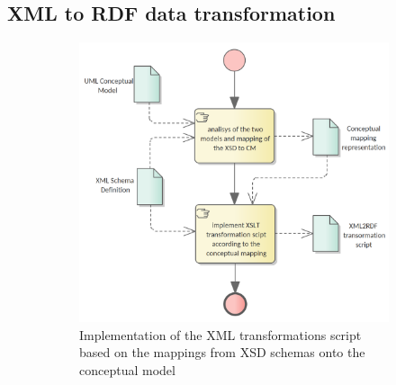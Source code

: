 	\subsection{XML to RDF data transformation}
	\label{sec:xml2rdf}
	

	\begin{figure}
		\centering
		\begin{subfigure}[b]{.48\textwidth}
			\centering
			\includegraphics[width=1.05\linewidth]{../img/xml2rdfScriptCreation.png}
			\caption{Implementation of the XML transformations script based on the mappings from XSD schemas onto the conceptual model}
			\label{fig:sub1}
		\end{subfigure}%
		\quad
		\begin{subfigure}[b]{.48\textwidth}
			\centering

\end{subfigure}
\end{figure}
